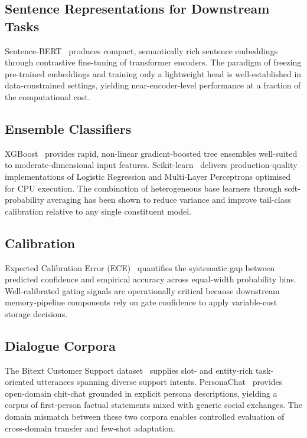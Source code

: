 \documentclass[conference]{IEEEtran}
\begin{document}
\subsection{Sentence Representations for Downstream Tasks}
Sentence-BERT~\cite{reimers2019sbert} produces compact,
semantically rich sentence embeddings through contrastive
fine-tuning of transformer encoders.
The paradigm of freezing pre-trained embeddings and training
only a lightweight head is well-established in
data-constrained settings, yielding near-encoder-level
performance at a fraction of the computational cost.

\subsection{Ensemble Classifiers}
XGBoost~\cite{chen2016xgboost} provides rapid, non-linear
gradient-boosted tree ensembles well-suited to
moderate-dimensional input features.
Scikit-learn~\cite{pedregosa2011sklearn} delivers
production-quality implementations of Logistic Regression
and Multi-Layer Perceptrons optimised for CPU execution.
The combination of heterogeneous base learners through
soft-probability averaging has been shown to reduce
variance and improve tail-class calibration relative to
any single constituent model.

\subsection{Calibration}
Expected Calibration Error (ECE)~\cite{guo2017calibration}
quantifies the systematic gap between predicted confidence
and empirical accuracy across equal-width probability bins.
Well-calibrated gating signals are operationally critical
because downstream memory-pipeline components rely on
gate confidence to apply variable-cost storage decisions.

\subsection{Dialogue Corpora}
The Bitext Customer Support
dataset~\cite{bitext2023} supplies slot- and entity-rich
task-oriented utterances spanning diverse support intents.
PersonaChat~\cite{zhang2018personachat} provides
open-domain chit-chat grounded in explicit persona
descriptions, yielding a corpus of first-person factual
statements mixed with generic social exchanges.
The domain mismatch between these two corpora enables
controlled evaluation of cross-domain transfer
and few-shot adaptation.
\end{document}
